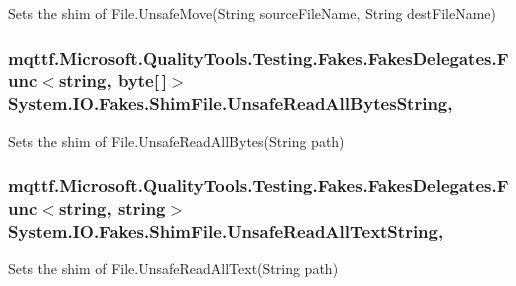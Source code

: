 Sets the shim of File.\-Unsafe\-Move(\-String source\-File\-Name, String dest\-File\-Name)

\hypertarget{class_system_1_1_i_o_1_1_fakes_1_1_shim_file_add1bcb01bbe1c2ae5ed0a20c671bf3ac}{
\subsubsection[{Unsafe\-Read\-All\-Bytes\-String}]{\setlength{\rightskip}{0pt plus 5cm}mqttf.\-Microsoft.\-Quality\-Tools.\-Testing.\-Fakes.\-Fakes\-Delegates.\-Func$<$string, byte\mbox{[}$\,$\mbox{]}$>$ System.\-I\-O.\-Fakes.\-Shim\-File.\-Unsafe\-Read\-All\-Bytes\-String\hspace{0.3cm}{\ttfamily [static]}, {\ttfamily [set]}}}\label{class_system_1_1_i_o_1_1_fakes_1_1_shim_file_add1bcb01bbe1c2ae5ed0a20c671bf3ac}


Sets the shim of File.\-Unsafe\-Read\-All\-Bytes(\-String path)

\hypertarget{class_system_1_1_i_o_1_1_fakes_1_1_shim_file_a2a5687885e721e02dc470c871b9156fe}{
\subsubsection[{Unsafe\-Read\-All\-Text\-String}]{\setlength{\rightskip}{0pt plus 5cm}mqttf.\-Microsoft.\-Quality\-Tools.\-Testing.\-Fakes.\-Fakes\-Delegates.\-Func$<$string, string$>$ System.\-I\-O.\-Fakes.\-Shim\-File.\-Unsafe\-Read\-All\-Text\-String\hspace{0.3cm}{\ttfamily [static]}, {\ttfamily [set]}}}\label{class_system_1_1_i_o_1_1_fakes_1_1_shim_file_a2a5687885e721e02dc470c871b9156fe}


Sets the shim of File.\-Unsafe\-Read\-All\-Text(\-String path)

